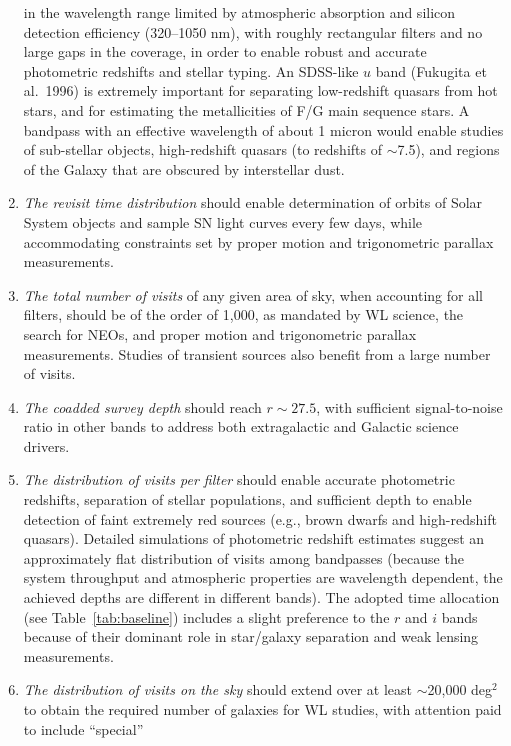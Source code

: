 \begin{enumerate}
    in the wavelength range limited by atmospheric absorption and
    silicon detection efficiency (320--1050 nm), with roughly
    rectangular filters and no large gaps in the coverage, in order
    to enable robust and accurate photometric redshifts and stellar typing. An
    SDSS-like $u$ band (Fukugita et al.~1996) is extremely important for separating
    low-redshift quasars from hot stars, and for estimating the metallicities of
    F/G main sequence stars. A bandpass with an effective wavelength of
    about 1 micron  would enable studies of sub-stellar objects, high-redshift
    quasars (to redshifts of $\sim$7.5), and regions of the Galaxy that are obscured
    by interstellar dust.
\item  {\it The revisit time distribution} should enable determination of
   orbits of Solar System objects and sample SN light curves every few days,
   while accommodating constraints set by proper motion and trigonometric
   parallax measurements.
\item  {\it The total number of visits} of any given area of sky, when accounting for all
   filters, should be of the order of 1,000, as mandated by WL
   science, the search for NEOs, and proper motion and
   trigonometric parallax measurements. Studies of transient sources
   also benefit from a large number of visits.
\item  {\it The coadded survey depth} should reach
    $r\sim27.5$, with sufficient signal-to-noise ratio in other bands
    to address both extragalactic and Galactic science drivers.
\item  {\it The distribution of visits per filter} should enable
   accurate photometric redshifts, separation of stellar populations,
   and sufficient depth to enable detection of faint extremely red
   sources (e.g., brown dwarfs and high-redshift quasars). Detailed simulations of
   photometric redshift estimates
   suggest an approximately flat distribution of visits among bandpasses
   (because the system throughput and atmospheric properties are
    wavelength dependent, the achieved depths are different in different
    bands). The adopted time allocation
   (see Table~\ref{tab:baseline}) includes a slight preference to the $r$ and $i$ bands because of their
   dominant role in star/galaxy separation and weak lensing measurements.
\item  {\it The distribution of visits on the sky} should extend over
   at least $\sim$20,000 deg$^2$ to obtain the required number of galaxies
   for WL studies, with attention paid to include ``special''

\end{enumerate}
